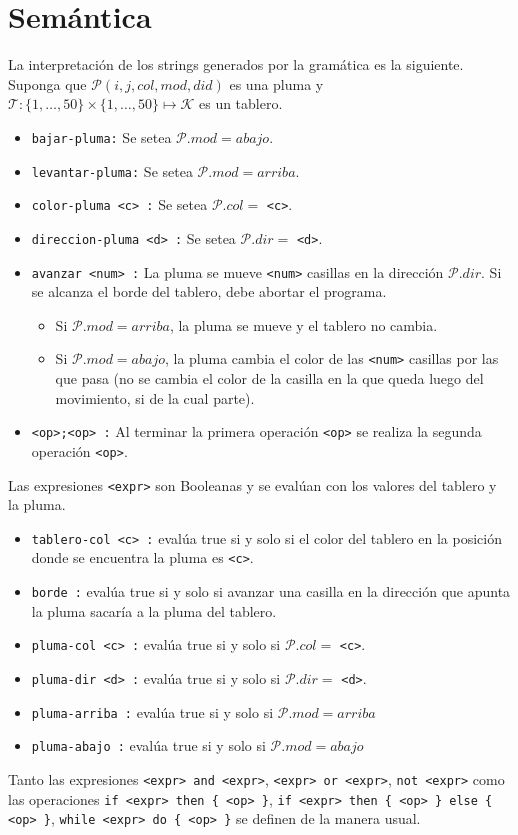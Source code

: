 \documentclass[dcc]{fcfmcourse}
\begin{document}
\section*{Semántica}
La interpretación de los strings generados por la gramática es la siguiente. Suponga que $\mathcal{P}(i,j,col,mod,did)$ es una pluma y $\mathcal{T}:\{1,\ldots,50\} \times \{1,\ldots,50\} \mapsto \mathcal{K}$ es un tablero.
\begin{itemize}
\item \texttt{bajar-pluma:} Se setea $\mathcal{P}.mod = abajo$.
\item \texttt{levantar-pluma:} Se setea $\mathcal{P}.mod = arriba$.
\item \texttt{color-pluma <c> :} Se setea $\mathcal{P}.col =$ \texttt{<c>}.
\item \texttt{direccion-pluma <d> :} Se setea $\mathcal{P}.dir =$ \texttt{<d>}.
\item \texttt{avanzar <num> :} La pluma se mueve \texttt{<num>} casillas en la dirección $\mathcal{P}.dir$. Si se alcanza el borde del tablero, debe abortar el programa.
\begin{itemize}
\item Si $\mathcal{P}.mod=arriba$, la pluma se mueve y el tablero no cambia.
\item Si $\mathcal{P}.mod=abajo$, la pluma cambia el color de las \texttt{<num>} casillas por las que pasa (no se cambia el color de la casilla en la que queda luego del movimiento, si de la cual parte).
\end{itemize}
\item \texttt{<op>;<op> :} Al terminar la primera operación \texttt{<op>} se realiza la segunda operación \texttt{<op>}.
\end{itemize}
Las expresiones \texttt{<expr>} son Booleanas y se evalúan con los valores del tablero y la pluma.
\begin{itemize}
\item \texttt{tablero-col <c> :} evalúa true si y solo si el color del tablero en la posición donde se encuentra la pluma es \texttt{<c>}.
\item \texttt{borde :} evalúa true si y solo si avanzar una casilla en la dirección que apunta la pluma sacaría a la pluma del tablero.
\item \texttt{pluma-col <c> :} evalúa true si y solo si $\mathcal{P}.col =$ \texttt{<c>}.
\item \texttt{pluma-dir <d> :} evalúa true si y solo si $\mathcal{P}.dir = $ \texttt{<d>}.
\item \texttt{pluma-arriba :} evalúa true si y solo si $\mathcal{P}.mod = arriba$
\item \texttt{pluma-abajo :} evalúa true si y solo si $\mathcal{P}.mod = abajo$
\end{itemize}
Tanto las expresiones \texttt{<expr> and <expr>}, \texttt{<expr> or <expr>}, \texttt{not <expr>} como las operaciones \texttt{if <expr> then \{ <op> \}}, \texttt{if <expr> then \{ <op> \} else \{ <op> \}}, \texttt{while <expr> do \{ <op> \}} se definen de la manera usual.
\end{document}
